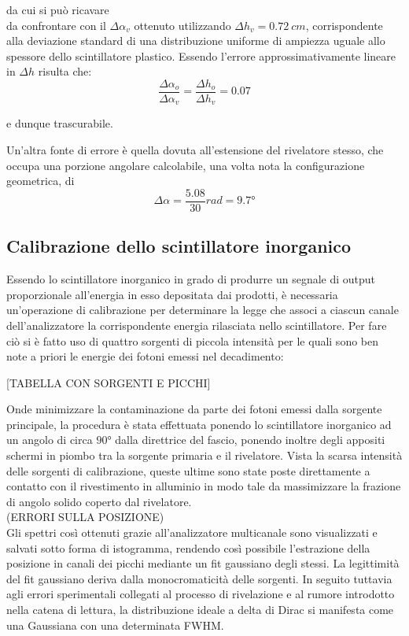 \documentclass[11pt]{article}
\begin{document}
da cui si può ricavare \\

da confrontare con il $\Delta \alpha_v$ ottenuto utilizzando $\Delta h_v = 0.72 \ cm$, corrispondente alla deviazione standard di una distribuzione uniforme di ampiezza uguale allo spessore dello scintillatore plastico. Essendo l'errore approssimativamente lineare in $\Delta h$ risulta che: \\
\begin{equation}
\frac{\Delta \alpha_o}{\Delta \alpha_v} = \frac{\Delta h_o}{\Delta h_v} = 0.07 
\end{equation}

e dunque trascurabile.

Un'altra fonte di errore è quella dovuta all'estensione del rivelatore stesso, che occupa una porzione angolare calcolabile, una volta nota la configurazione geometrica, di \\
\begin{equation}
\Delta \alpha = \frac{5.08}{30} rad = 9.7°
\nonumber
\end{equation}





\subsection{Calibrazione dello scintillatore inorganico}

Essendo lo scintillatore inorganico in grado di produrre un segnale di output proporzionale all'energia in esso depositata dai prodotti, è necessaria un'operazione di calibrazione per determinare la legge che associ a ciascun canale dell'analizzatore la corrispondente energia rilasciata nello scintillatore. 
Per fare ciò si è fatto uso di quattro sorgenti di piccola intensità per le quali sono ben note a priori le energie dei fotoni emessi nel decadimento:

[TABELLA CON SORGENTI E PICCHI]

Onde minimizzare la contaminazione da parte dei fotoni emessi dalla sorgente principale, la procedura è stata effettuata ponendo lo scintillatore inorganico ad un angolo di circa $90°$ dalla direttrice del fascio, ponendo inoltre degli appositi schermi in piombo tra la sorgente primaria e il rivelatore. Vista la scarsa intensità delle sorgenti di calibrazione, queste ultime sono state poste direttamente a contatto con il rivestimento in alluminio in modo tale da massimizzare la frazione di angolo solido coperto dal rivelatore.\\
(ERRORI SULLA POSIZIONE)\\
Gli spettri così ottenuti grazie all'analizzatore multicanale sono visualizzati e salvati sotto forma di istogramma, rendendo così possibile l'estrazione della posizione in canali dei picchi mediante un fit gaussiano degli stessi. La legittimità del fit gaussiano deriva dalla monocromaticità delle sorgenti. In seguito tuttavia agli errori sperimentali collegati al processo di rivelazione e al rumore introdotto nella catena di lettura, la distribuzione ideale a delta di Dirac si manifesta come una Gaussiana con una determinata FWHM.\\
\end{document}
